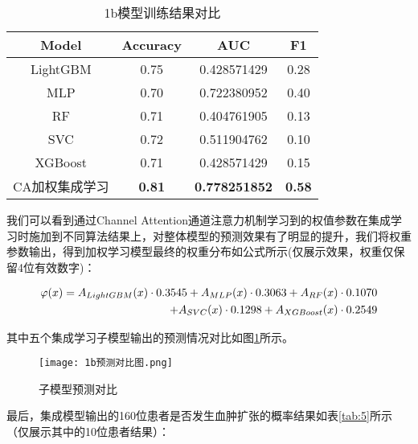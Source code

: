 \documentclass[bwprint]{gmcmthesis}
\begin{document}
				\begin{table}[H]
					\centering
					\caption{1b模型训练结果对比}
					\label{tab:3}
					\setlength{\tabcolsep}{7mm}
					\begin{tabular}{|c|c|c|c|}
						\hline
						\rowcolor{green!30} Model & Accuracy & AUC & F1 \\ \hline
						\rowcolor{green!5}LightGBM & 0.75  & 0.428571429 & 0.28\\ \hline
						\rowcolor{white!5}MLP & 0.70  & 0.722380952
						  & 0.40  \\ \hline
						\rowcolor{green!5}RF & 0.71  & 0.404761905
						  & 0.13  \\ \hline
						\rowcolor{white!5}SVC & 0.72  & 0.511904762
						  & 0.10  \\ \hline
						\rowcolor{green!5}XGBoost & 0.71  & 0.428571429
						  & 0.15  \\ \hline
						\rowcolor{white!5}CA加权集成学习 & \textbf{0.81}  & \textbf{0.778251852}  & \textbf{0.58}  \\ \hline
					\end{tabular}
				\end{table}
				
				我们可以看到通过Channel Attention通道注意力机制学习到的权值参数在集成学习时施加到不同算法结果上，对整体模型的预测效果有了明显的提升，我们将权重参数输出，得到加权学习模型最终的权重分布如公式所示(仅展示效果，权重仅保留4位有效数字)：
				
				\begin{equation}
					\centering
					\begin{aligned} 
						\varphi(x)=A_{LightGBM}(x)\cdot 0.3545+A_{MLP}(x)\cdot 0.3063+A_{RF}(x)\cdot 0.1070 \\ +A_{SVC}(x)\cdot 0.1298+A_{XGBoost}(x)\cdot 0.2549
					\end{aligned}
				\end{equation}
				
				其中五个集成学习子模型输出的预测情况对比如图\ref{fig:7}所示。
				
				\begin{figure}[H]
					\centering
					\caption{子模型预测对比}
					\texttt{[image: 1b预测对比图.png]}
					\label{fig:7}
				\end{figure}
				
				最后，集成模型输出的160位患者是否发生血肿扩张的概率结果如表\ref{tab:5}所示（仅展示其中的10位患者结果）：
				
\end{document}
